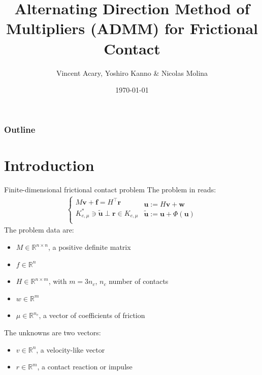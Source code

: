 \documentclass[8pt,red]{beamer}
\title{Alternating Direction Method of Multipliers (ADMM) for Frictional Contact}
\author{Vincent Acary, Yoshiro Kanno \& Nicolas Molina}
\date{\today }
\theoremstyle{plain}
\theoremstyle{definition}
\theoremstyle{remark}
\renewcommand{\Re}{\ensuremath{\mathbb{R}}}
\newcommand{\bi}[1]{\ensuremath{\boldsymbol{#1}}}
\begin{document}
{
}

\begin{frame}
\frametitle{Outline}
\small 
\tableofcontents[hideallsubsections]
\end{frame}


\section{Introduction}
\begin{frame}{Finite-dimensional frictional contact problem}
The problem in \citep{Acary2013} reads:
\begin{align}
	\begin{cases}
	M \bi{v} + \bi{f} = H^{\top} \bi{r}  \\
	K_{e,\mu}^{*}\ni \tilde{\bi{u}} \perp \bi{r} \in K_{e,\mu} \\
	\end{cases}
	\begin{array}{l}
	\bi{u} := H \bi{v} + \bi{w} \\
	\tilde{\bi{u}} := \bi{u} + \Phi(\bi{u})
	\end{array}
	\label{CF.complementary}
\end{align}
The problem data are:
\begin{itemize}
\item $M \in \Re^{n \times n}$, a positive definite matrix 
\item $f \in \Re^{n}$
\item $H \in \Re^{n \times m}$, with $m = 3n_{c}$, $n_{c}$ number of contacts
\item $w \in \Re^{m}$
\item $\mu \in \Re^{n_{c}}$, a vector of coefficients of friction 
\end{itemize}
The unknowns are two vectors:
\begin{itemize}
\item $v \in \Re^{n}$, a velocity-like vector
\item $r \in \Re^{m}$, a contact reaction or impulse
\end{itemize}
\end{frame}
\end{document}
